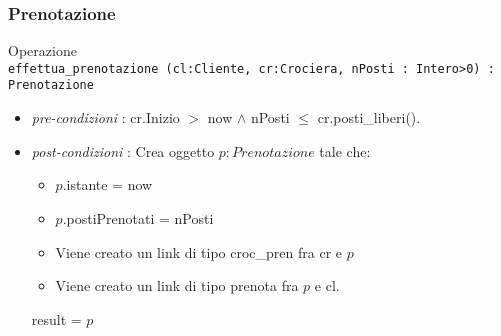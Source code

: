 \documentclass[12pt, letterpaper]{article}
\newcommand{\code}[1]{\colorbox{light-gray}{\texttt{#1}}}
\begin{document}
\subsubsection{Prenotazione}
Operazione\\ \code{effettua\_prenotazione (cl:Cliente, cr:Crociera, nPosti : Intero>0) : Prenotazione} \begin{itemize}
    \item \textit{pre-condizioni} : cr.Inizio $>$ now $\land$  nPosti $\le$ cr.posti\_liberi(). 
    \item \textit{post-condizioni} : Crea oggetto $p:Prenotazione$ tale che:\begin{itemize}
        \item $p$.istante = now 
        \item $p$.postiPrenotati = nPosti
    
    \item Viene creato un link di tipo croc\_pren fra cr e $p$\item Viene creato un link di tipo prenota fra $p$ e cl.
\end{itemize}
result = $p$
\end{itemize}
\end{document}
